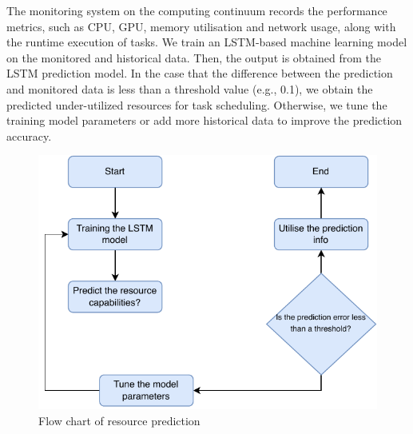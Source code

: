         The monitoring system on the computing continuum records the performance metrics, such as CPU, GPU, memory utilisation and network usage, along with the runtime execution of tasks. We train an LSTM-based machine learning model on the monitored and historical data. Then, the output is obtained from the LSTM prediction model. In the case that the difference between the prediction and monitored data is less than a threshold value (e.g., 0.1), we obtain the predicted under-utilized resources for task scheduling. Otherwise, we tune the training model parameters or add more historical data to improve the prediction accuracy.

        \begin{figure}
            \centering
            \includegraphics{figures/resource_prediction_flow_chart.pdf}
            \caption{Flow chart of resource prediction}
            \label{fig:flow-chart-of-resource-prediction}
        \end{figure}

